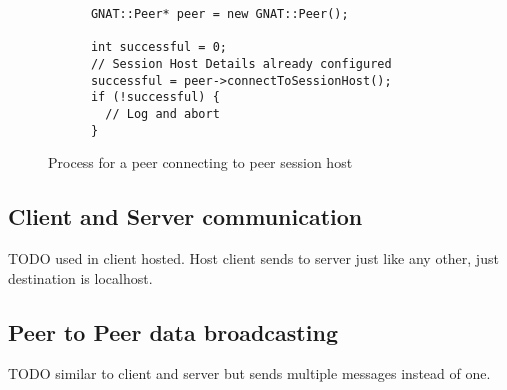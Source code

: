 \begin{figure}[!h]
  \centering
  \begin{lstlisting}
      GNAT::Peer* peer = new GNAT::Peer();

      int successful = 0;
      // Session Host Details already configured
      successful = peer->connectToSessionHost();
      if (!successful) {
        // Log and abort
      }
  \end{lstlisting}
  \caption{Process for a peer connecting to peer session host}
  \label{code:peer_conn_join}
\end{figure}

\newpage

\subsection{Client and Server communication}
TODO used in client hosted. Host client sends to server just like any other, just destination is localhost.





\subsection{Peer to Peer data broadcasting}
TODO similar to client and server but sends multiple messages instead of one.
